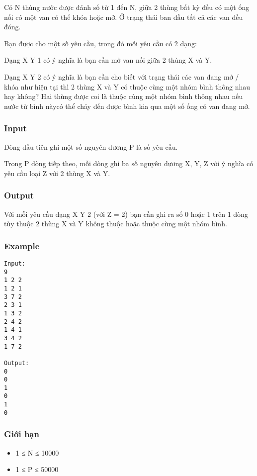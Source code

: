 



   Có N thùng nước được đánh số từ 1 đến N, giữa 2 thùng bất kỳ đều có một ống nối có một van có thể khóa hoặc mở. Ở trạng thái ban đầu tất cả các van đều đóng.  

   Bạn được cho một số yêu cầu, trong đó mỗi yêu cầu có 2 dạng:  

   Dạng X Y 1 có ý nghĩa là bạn cần mở van nối giữa 2 thùng X và Y.  

   Dạng X Y 2 có ý nghĩa là bạn cần cho biết với trạng thái các van đang mở / khóa như hiện tại thì 2 thùng X và Y có thuộc cùng một nhóm bình thông nhau hay không? Hai thùng được coi là thuộc cùng một nhóm bình thông nhau nếu nước từ bình nàycó thể chảy đến được bình kia qua một số ống có van đang mở.  

\subsubsection{   Input  }

   Dòng đầu tiên ghi một số nguyên dương P là số yêu cầu.  

   Trong P dòng tiếp theo, mỗi dòng ghi ba số nguyên dương X, Y, Z với ý nghĩa có yêu cầu loại Z với 2 thùng X và Y.  

\subsubsection{   Output  }

   Với mỗi yêu cầu dạng X Y 2 (với Z = 2) bạn cần ghi ra số 0 hoặc 1 trên 1 dòng tùy thuộc 2 thùng X và Y không thuộc hoặc thuộc cùng một nhóm bình.  

\subsubsection{   Example  }
\begin{verbatim}
Input:
9
1 2 2 
1 2 1
3 7 2
2 3 1
1 3 2
2 4 2
1 4 1
3 4 2
1 7 2

Output:
0
0
1
0
1
0
\end{verbatim}

\subsubsection{   Giới hạn  }
\begin{itemize}
	\item     1 ≤ N ≤ 10000   
	\item     1 ≤ P ≤ 50000   
\end{itemize}